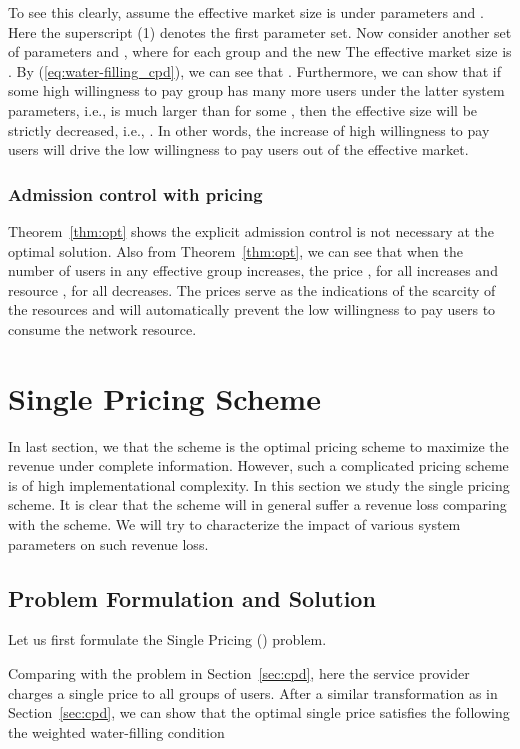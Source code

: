 \documentclass[twocolumn,10pt,twosided]{IEEEtran}
\begin{document}
To see this clearly, assume the effective market size is  under parameters  and .
Here the superscript (1) denotes the first parameter set.  Now consider another set of parameters  and , where  for each group  and the new  The effective market size is . By (\ref{eq:water-filling_cpd}), we can see that . Furthermore, we can show that if some high willingness to pay group has many more users under the latter system parameters, i.e.,  is much larger than  for some , then the effective size will be strictly decreased, i.e., . In other words, the increase of high willingness to pay users will drive the low willingness to pay users out of the effective market.



\subsubsection{Admission control with pricing} Theorem~\ref{thm:opt} shows the explicit admission control is not necessary  at the optimal solution. Also from Theorem~\ref{thm:opt}, we can see that when the number of users in any effective group increases, the price , for all  increases and resource , for all  decreases. The prices serve as the indications of the scarcity of the resources and will automatically prevent the low willingness to pay users to consume the network resource.


\section{Single Pricing Scheme}
\label{sec:single_price}
In last section, we  that the  scheme is the optimal pricing scheme to maximize the revenue under complete
information. However, such a complicated pricing scheme is of high implementational complexity. In this section we study the single pricing scheme. It is clear that the scheme will in general suffer a revenue loss comparing with the  scheme. We will try to characterize the impact of various system parameters on such revenue loss.

\subsection{Problem Formulation and Solution}
Let us first formulate the Single Pricing () problem.

Comparing with the  problem in Section~\ref{sec:cpd}, here the service provider charges a single price  to all groups of users. After a similar transformation as in Section~\ref{sec:cpd}, we can show that the optimal single price satisfies the following the weighted water-filling condition
\end{document}
